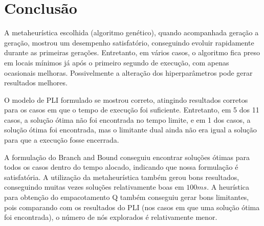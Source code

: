 \documentclass[a4paper,11pt]{article}
\begin{document}
\section{Conclusão}
A metaheurística escolhida (algoritmo genético), quando acompanhada geração a geração, mostrou
um desempenho satisfatório, conseguindo evoluir rapidamente durante as primeiras gerações. Entretanto,
em vários casos, o algoritmo fica preso em locais mínimos já após o primeiro segundo de execução,
com apenas ocasionais melhoras. Possivelmente a alteração dos hiperparâmetros pode gerar resultados melhores.

O modelo de PLI formulado se mostrou correto, atingindo resultados corretos para os casos em que
o tempo de execução foi suficiente. Entretanto, em 5 dos 11 casos, a solução ótima não foi encontrada
no tempo limite, e em 1 dos casos, a solução ótima foi encontrada, mas o limitante dual ainda não era
igual a solução para que a execução fosse encerrada.

A formulação do Branch and Bound conseguiu encontrar soluções ótimas para todos os casos dentro
do tempo alocado, indicando que nossa formulação é satisfatória. A utilização da metaheurística
também gerou bons resultados, conseguindo muitas vezes soluções relativamente boas em $100ms$.
A heurística para obtenção do empacotamento Q também conseguiu gerar bons limitantes, pois
comparando com os resultados do PLI (nos casos em que uma solução ótima foi encontrada),
o número de nós explorados é relativamente menor.
\end{document}
